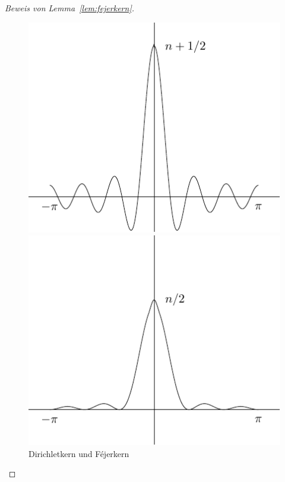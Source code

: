 \documentclass[../main.tex]{subfiles}
\begin{document}
\begin{proof}[Beweis von Lemma~\ref{lem:fejerkern}]
\begin{figure}[htb] 
  \centering
  \begin{minipage}{0.50\textwidth}
    \centering
    \includegraphics{images/dirichlet}
  \end{minipage}%
  \begin{minipage}{0.50\textwidth}
    \centering
    \includegraphics{images/fejer}
  \end{minipage}%
  \caption{Dirichletkern und Féjerkern}%
  \label{fig:dirichlet}
\end{figure}


\end{proof}
\end{document}
